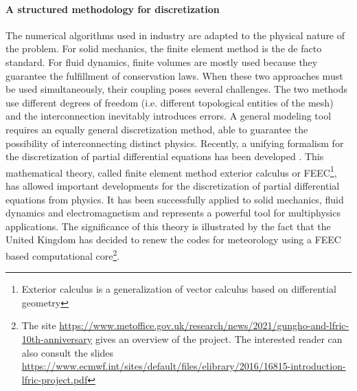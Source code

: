 \documentclass[12pt]{article}
\begin{document}
	\paragraph{A structured methodology for discretization\\}
	
	The numerical algorithms used in industry are adapted to the physical nature of the problem. For solid mechanics, the finite element method is the de facto standard. For fluid dynamics, finite volumes are mostly used because they guarantee the fulfillment of conservation laws. When these two approaches must be used simultaneously, their coupling poses several challenges. The two methods use different degrees of freedom (i.e. different topological entities of the mesh) and the interconnection inevitably introduces errors. A general modeling tool requires an equally general discretization method, able to guarantee the possibility of interconnecting distinct physics. Recently, a unifying formalism for the discretization of partial differential equations has been developed \cite{arnold2006acta}. This mathematical theory, called finite element method exterior calculus or FEEC\footnote{Exterior calculus is a generalization of vector calculus based on differential geometry}, has allowed important developments for the discretization of partial differential equations from physics. It has been successfully applied to solid mechanics, fluid dynamics and electromagnetism and represents a powerful tool for multiphysics applications. The significance of this theory is illustrated by the fact that the United Kingdom has decided to renew the codes for meteorology using a FEEC based computational core\footnote{The site \url{https://www.metoffice.gov.uk/research/news/2021/gungho-and-lfric-10th-anniversary} gives an overview of the project. The interested reader can also consult the slides  \url{https://www.ecmwf.int/sites/default/files/elibrary/2016/16815-introduction-lfric-project.pdf}}.
	
\end{document}
